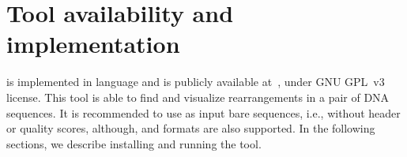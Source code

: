 \documentclass[a4paper,9pt]{extarticle}
\begin{document}
\clearpage
\section{Tool availability and implementation}
\label{sec.tool}
\smashpp is implemented in \cpp language and is publicly available at~\cite{web-smashpp}, under GNU GPL~v3 license. This tool is able to find and visualize rearrangements in a pair of DNA sequences. It is recommended to use as input bare sequences, i.e., without header or quality scores, although, \fasta and \fastq formats are also supported. In the following sections, we describe installing and running the \smashpp tool.




\end{document}
